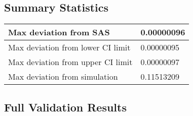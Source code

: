 \documentclass{glimmpse-report}
\begin{document}
\subsection{Summary Statistics}
\begin{tabular}{|l|l|}
\hline
Max deviation from SAS & 0.00000096\tabularnewline
\hline

Max deviation from lower CI limit & 0.00000095\tabularnewline
\hline

Max deviation from upper CI limit & 0.00000097\tabularnewline
\hline

Max deviation from simulation & 0.11513209\tabularnewline
\hline

\end{tabular}
\subsection{Full Validation Results}
\end{document}

